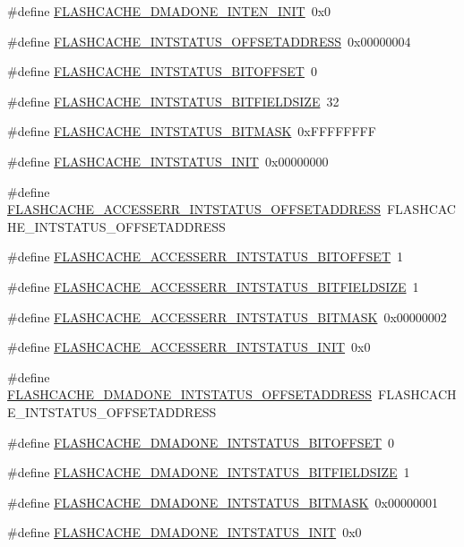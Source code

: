 \begin{DoxyCompactItemize}
\item 
\#define \hyperlink{a00550_aabe5a7402e6c6a6855c1c22f2b492ccc}{FLASHCACHE\_\-DMADONE\_\-INTEN\_\-INIT}~0x0
\item 
\#define \hyperlink{a00550_abb5379c8a0df61eb10a8260f7704b501}{FLASHCACHE\_\-INTSTATUS\_\-OFFSETADDRESS}~0x00000004
\item 
\#define \hyperlink{a00550_a7e535fe0f13962043638e48a0ca930c1}{FLASHCACHE\_\-INTSTATUS\_\-BITOFFSET}~0
\item 
\#define \hyperlink{a00550_a5a21b4fe0dd1c8928cf0fe918f8730f4}{FLASHCACHE\_\-INTSTATUS\_\-BITFIELDSIZE}~32
\item 
\#define \hyperlink{a00550_a3c7ccc457bc00e0e4ca88041be4032a2}{FLASHCACHE\_\-INTSTATUS\_\-BITMASK}~0xFFFFFFFF
\item 
\#define \hyperlink{a00550_a0d0cc5d8f5232ed067c81060458d5e20}{FLASHCACHE\_\-INTSTATUS\_\-INIT}~0x00000000
\item 
\#define \hyperlink{a00550_a687c1bc9bc63d499e7ef79e9f2c5cda1}{FLASHCACHE\_\-ACCESSERR\_\-INTSTATUS\_\-OFFSETADDRESS}~FLASHCACHE\_\-INTSTATUS\_\-OFFSETADDRESS
\item 
\#define \hyperlink{a00550_aa3f6303da984b93ec90dbe198183da6d}{FLASHCACHE\_\-ACCESSERR\_\-INTSTATUS\_\-BITOFFSET}~1
\item 
\#define \hyperlink{a00550_acf9f5686aac3b8a6470fd0cf656ed833}{FLASHCACHE\_\-ACCESSERR\_\-INTSTATUS\_\-BITFIELDSIZE}~1
\item 
\#define \hyperlink{a00550_a77eaf05f028f7e80293e83977c4f2467}{FLASHCACHE\_\-ACCESSERR\_\-INTSTATUS\_\-BITMASK}~0x00000002
\item 
\#define \hyperlink{a00550_a92c41c573e5e6c8c9e5562e39b58fca2}{FLASHCACHE\_\-ACCESSERR\_\-INTSTATUS\_\-INIT}~0x0
\item 
\#define \hyperlink{a00550_ab81bb20ba78c74f4f0834b1f066adc91}{FLASHCACHE\_\-DMADONE\_\-INTSTATUS\_\-OFFSETADDRESS}~FLASHCACHE\_\-INTSTATUS\_\-OFFSETADDRESS
\item 
\#define \hyperlink{a00550_aab3b93bc87481f9f61183e13b2410066}{FLASHCACHE\_\-DMADONE\_\-INTSTATUS\_\-BITOFFSET}~0
\item 
\#define \hyperlink{a00550_a2f184a625b40f04930ba8fa074f006ae}{FLASHCACHE\_\-DMADONE\_\-INTSTATUS\_\-BITFIELDSIZE}~1
\item 
\#define \hyperlink{a00550_a133f4d6cfb06acb0e5adc91cb0b48668}{FLASHCACHE\_\-DMADONE\_\-INTSTATUS\_\-BITMASK}~0x00000001
\item 
\#define \hyperlink{a00550_ad3211f3607340d895f0a34a84af830f6}{FLASHCACHE\_\-DMADONE\_\-INTSTATUS\_\-INIT}~0x0

\end{DoxyCompactItemize}
